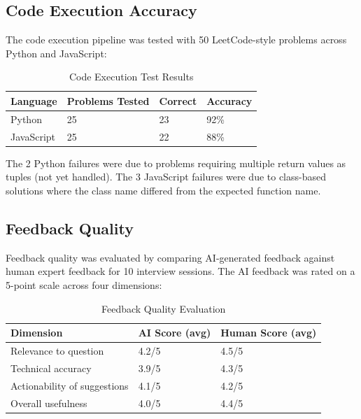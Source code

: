 \subsection{Code Execution Accuracy}

The code execution pipeline was tested with 50 LeetCode-style problems across Python and JavaScript:

\begin{table}[H]
\centering
\caption{Code Execution Test Results}
\vspace{8pt}
\begin{tabularx}{\textwidth}{|X|C{3cm}|C{2.5cm}|C{2.5cm}|}
\hline
\textbf{Language} & \textbf{Problems Tested} & \textbf{Correct} & \textbf{Accuracy} \\
\hline
Python & 25 & 23 & 92\% \\
\hline
JavaScript & 25 & 22 & 88\% \\
\hline
\end{tabularx}
\label{tab:codeexec}
\end{table}

The 2 Python failures were due to problems requiring multiple return values as tuples (not yet handled). The 3 JavaScript failures were due to class-based solutions where the class name differed from the expected function name.

\subsection{Feedback Quality}

Feedback quality was evaluated by comparing AI-generated feedback against human expert feedback for 10 interview sessions. The AI feedback was rated on a 5-point scale across four dimensions:

\begin{table}[H]
\centering
\caption{Feedback Quality Evaluation}
\vspace{8pt}
\begin{tabularx}{\textwidth}{|X|C{3cm}|C{3cm}|}
\hline
\textbf{Dimension} & \textbf{AI Score (avg)} & \textbf{Human Score (avg)} \\
\hline
Relevance to question & 4.2/5 & 4.5/5 \\
\hline
Technical accuracy & 3.9/5 & 4.3/5 \\
\hline
Actionability of suggestions & 4.1/5 & 4.2/5 \\
\hline
Overall usefulness & 4.0/5 & 4.4/5 \\
\hline
\end{tabularx}
\label{tab:feedbackquality}
\end{table}

